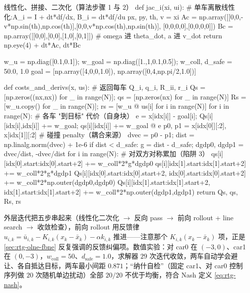 \begin{codebox}[Python]{线性化、拼接、二次化（算法步骤 1 与 2）}
def jac_i(xi, ui):                             # 单车离散线性化:A_i = I + dt*df/dx, B_i = dt*df/du
    px, py, th, v = xi
    Ac = np.array([[0,0,-v*np.sin(th),np.cos(th)],[0,0,v*np.cos(th),np.sin(th)],
                   [0,0,0,0],[0,0,0,0]])
    Bc = np.array([[0,0],[0,0],[1,0],[0,1]])   # omega 进 theta_dot, a 进 v_dot
    return np.eye(4) + dt*Ac, dt*Bc

w_u = np.diag([0.1,0.1]); w_goal = np.diag([1.,1,0.1,0.5]); w_coll, d_safe = 50.0, 1.0
goal = [np.array([4,0,0,1.0]), np.array([0,4,np.pi/2,1.0])]

def costs_and_derivs(x, us):                    # 返回每车 Q_i, q_i, R_ii, r_i
    Qs = [np.zeros((nx,nx)) for _ in range(N)]; qs = [np.zeros(nx) for _ in range(N)]
    Rs = [w_u.copy() for _ in range(N)];        rs = [w_u @ us[i] for i in range(N)]
    for i in range(N):                          # 各车 "到目标" 代价（自身块）
        e = x[idx[i]] - goal[i]; Qs[i][idx[i],idx[i]] += w_goal; qs[i][idx[i]] += w_goal @ e
    p0, p1 = x[idx[0]][:2], x[idx[1]][:2]       # 碰撞 penalty（耦合来源）
    dvec = p0 - p1; dist = np.linalg.norm(dvec) + 1e-6
    if dist < d_safe:
        g = dist - d_safe; dgdp0, dgdp1 = dvec/dist, -dvec/dist
        for i in range(N):                      # 对双方对称累加（陷阱 3）
            qs[i][idx[0].start:idx[0].start+2] += w_coll*2*g*dgdp0
            qs[i][idx[1].start:idx[1].start+2] += w_coll*2*g*dgdp1
            Qs[i][idx[0].start:idx[0].start+2, idx[0].start:idx[0].start+2] += w_coll*2*np.outer(dgdp0,dgdp0)
            Qs[i][idx[1].start:idx[1].start+2, idx[1].start:idx[1].start+2] += w_coll*2*np.outer(dgdp1,dgdp1)
    return Qs, qs, Rs, rs
\end{codebox}

\noindent 外层迭代把五步串起来（线性化二次化 $\to$ 反向 pass $\to$ 前向 rollout + line search $\to$ 收敛检查），前向 rollout 用反馈律 $u_{i,k}=\bar u_{i,k}-K_{i,k}(x_k-\bar x_k)-\alpha k_{i,k}$ 推进——注意那个 $K_{i,k}(x_k-\bar x_k)$ 项，正是 \cref{sec:rtg-olne-fbne} 反复强调的反馈纠偏项。数值实验：对 car0 在 $(-3,0)$、car1 在 $(0,-3)$，$w_{\text{coll}}=50$、$d_{\text{safe}}=1.0$，求解器 $29$ 次迭代收敛，两车自动学会避让、各自抵达目标，两车最小间距 $0.871$；“纳什自检”（固定 car1、对 car0 控制序列做 $20$ 次随机单边扰动）全部 $20/20$ 不优于均衡，符合 Nash 定义 \cref{eq:rtg-nash}\cite{fridovich2020efficient}。

